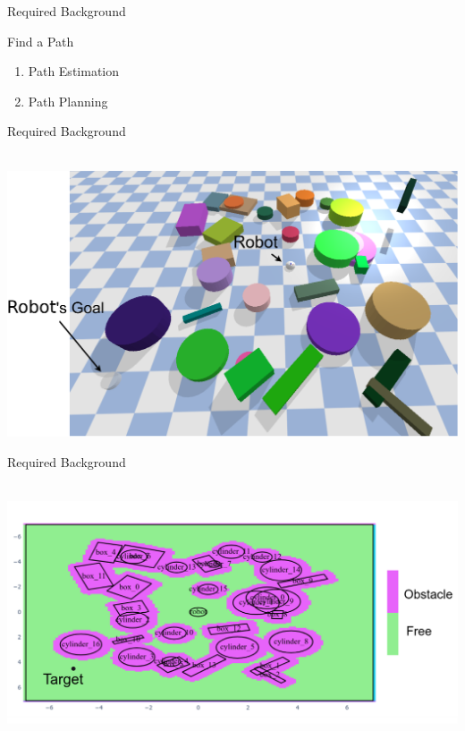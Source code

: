 \begin{frame}[fragile]{Required Background} 
\begin{block}{Find a Path}
\begin{enumerate}
  \item Path Estimation\\
  \item Path Planning\\
\end{enumerate}
\end{block}
\end{frame}

\begin{frame}[fragile]{Required Background} 
  \begin{center}
    \hbox{\hspace{-1.5em} \includegraphics[height=0.85\textheight]{figures/required_background/is_there_a_path}}
  \end{center}
\end{frame}

\begin{frame}[fragile]{Required Background} 
  \begin{center}
  \hbox{\hspace{0.0\textwidth} \includegraphics[width=1.0\textwidth]{figures/required_background/occupancy_grid} }
  \end{center}
\end{frame}

